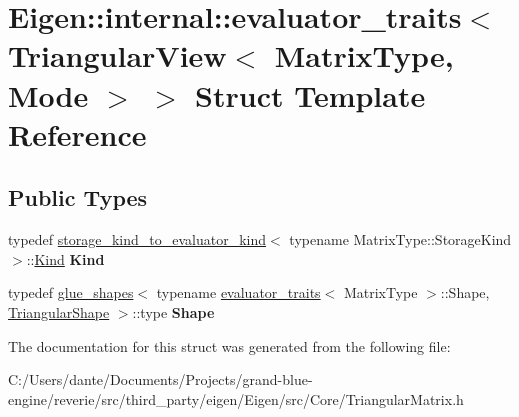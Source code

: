 \hypertarget{struct_eigen_1_1internal_1_1evaluator__traits_3_01_triangular_view_3_01_matrix_type_00_01_mode_01_4_01_4}{}\section{Eigen\+::internal\+::evaluator\+\_\+traits$<$ Triangular\+View$<$ Matrix\+Type, Mode $>$ $>$ Struct Template Reference}
\label{struct_eigen_1_1internal_1_1evaluator__traits_3_01_triangular_view_3_01_matrix_type_00_01_mode_01_4_01_4}
\subsection*{Public Types}
\begin{DoxyCompactItemize}
\item 
\mbox{\label{struct_eigen_1_1internal_1_1evaluator__traits_3_01_triangular_view_3_01_matrix_type_00_01_mode_01_4_01_4_a6e6b35c64cc84055d9eda9641e741e7e}} 
typedef \mbox{\hyperlink{struct_eigen_1_1internal_1_1storage__kind__to__evaluator__kind}{storage\+\_\+kind\+\_\+to\+\_\+evaluator\+\_\+kind}}$<$ typename Matrix\+Type\+::\+Storage\+Kind $>$\+::\mbox{\hyperlink{struct_eigen_1_1internal_1_1_index_based}{Kind}} {\bfseries Kind}
\item 
\mbox{\label{struct_eigen_1_1internal_1_1evaluator__traits_3_01_triangular_view_3_01_matrix_type_00_01_mode_01_4_01_4_ac1b77b5d12792f089ecb4baea6b3b203}} 
typedef \mbox{\hyperlink{struct_eigen_1_1internal_1_1glue__shapes}{glue\+\_\+shapes}}$<$ typename \mbox{\hyperlink{struct_eigen_1_1internal_1_1evaluator__traits}{evaluator\+\_\+traits}}$<$ Matrix\+Type $>$\+::Shape, \mbox{\hyperlink{struct_eigen_1_1_triangular_shape}{Triangular\+Shape}} $>$\+::type {\bfseries Shape}
\end{DoxyCompactItemize}


The documentation for this struct was generated from the following file\+:\begin{DoxyCompactItemize}
\item 
C\+:/\+Users/dante/\+Documents/\+Projects/grand-\/blue-\/engine/reverie/src/third\+\_\+party/eigen/\+Eigen/src/\+Core/Triangular\+Matrix.\+h\end{DoxyCompactItemize}
